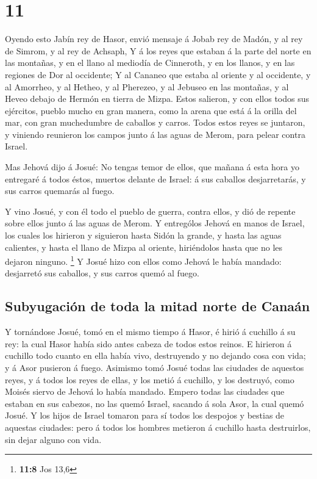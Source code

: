 \hypertarget{section-10}{%
\section{11}\label{section-10}}

 Oyendo esto Jabín rey de Hasor, envió mensaje á Jobab rey
de Madón, y al rey de Simrom, y al rey de Achsaph,  Y á
los reyes que estaban á la parte del norte en las montañas, y en el
llano al mediodía de Cinneroth, y en los llanos, y en las regiones de
Dor al occidente;  Y al Cananeo que estaba al oriente y al
occidente, y al Amorrheo, y al Hetheo, y al Pherezeo, y al Jebuseo en
las montañas, y al Heveo debajo de Hermón en tierra de Mizpa.
 Estos salieron, y con ellos todos sus ejércitos, pueblo
mucho en gran manera, como la arena que está á la orilla del mar, con
gran muchedumbre de caballos y carros.  Todos estos reyes
se juntaron, y viniendo reunieron los campos junto á las aguas de Merom,
para pelear contra Israel.

 Mas Jehová dijo á Josué: No tengas temor de ellos, que
mañana á esta hora yo entregaré á todos éstos, muertos delante de
Israel: á sus caballos desjarretarás, y sus carros quemarás al fuego.

 Y vino Josué, y con él todo el pueblo de guerra, contra
ellos, y dió de repente sobre ellos junto á las aguas de Merom.
 Y entrególos Jehová en manos de Israel, los cuales los
hirieron y siguieron hasta Sidón la grande, y hasta las aguas calientes,
y hasta el llano de Mizpa al oriente, hiriéndolos hasta que no les
dejaron ninguno. \footnote{\textbf{11:8} Jos 13,6}  Y
Josué hizo con ellos como Jehová le había mandado: desjarretó sus
caballos, y sus carros quemó al fuego.

\hypertarget{subyugaciuxf3n-de-toda-la-mitad-norte-de-canauxe1n}{%
\subsection{Subyugación de toda la mitad norte de
Canaán}\label{subyugaciuxf3n-de-toda-la-mitad-norte-de-canauxe1n}}

 Y tornándose Josué, tomó en el mismo tiempo á Hasor, é
hirió á cuchillo á su rey: la cual Hasor había sido antes cabeza de
todos estos reinos.  E hirieron á cuchillo todo cuanto en
ella había vivo, destruyendo y no dejando cosa con vida; y á Asor
pusieron á fuego.  Asimismo tomó Josué todas las ciudades
de aquestos reyes, y á todos los reyes de ellas, y los metió á cuchillo,
y los destruyó, como Moisés siervo de Jehová lo había mandado.
 Empero todas las ciudades que estaban en sus cabezos, no
las quemó Israel, sacando á sola Asor, la cual quemó Josué.
 Y los hijos de Israel tomaron para sí todos los despojos
y bestias de aquestas ciudades: pero á todos los hombres metieron á
cuchillo hasta destruirlos, sin dejar alguno con vida.

